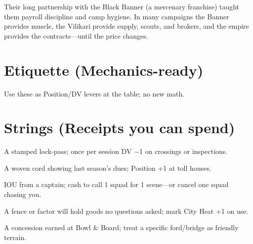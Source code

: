 \documentclass[11pt,letterpaper]{article}
\begin{document}
Their long partnership with the Black Banner (a mercenary franchise) taught them payroll discipline and camp hygiene. In many campaigns the Banner provides muscle, the Vilikari provide supply, scouts, and brokers, and the empire provides the contracts---until the price changes.

\section{Etiquette (Mechanics-ready)}

Use these as Position/DV levers at the table; no new math.





\section{Strings (Receipts you can spend)}

\begin{description}[leftmargin=*]
\item[Reed Chit] A stamped lock-pass; once per session DV −1 on crossings or inspections.
\item[Toll Braid] A woven cord showing last season's dues; Position +1 at toll houses.
\item[Black Banner Voucher] IOU from a captain; cash to call 1 squad for 1 scene---or cancel one squad chasing you.
\item[Guild Widow's Trust] A fence or factor will hold goods no questions asked; mark City Heat +1 on use.
\item[Ford Right (Season)] A concession earned at Bowl \& Board; treat a specific ford/bridge as friendly terrain.
\end{description}
\end{document}
